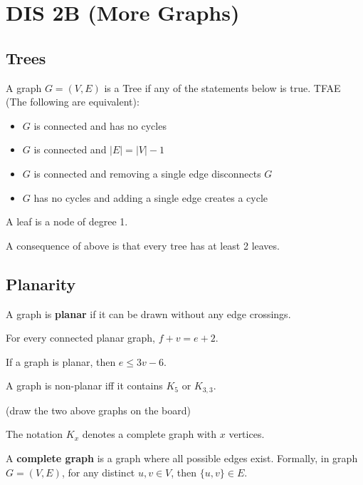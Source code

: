 \section{DIS 2B (More Graphs)}

\subsection{Trees}
A graph $G = (V,E)$ is a Tree if any of the statements below is true. TFAE (The following are equivalent):

\begin{itemize}
    \item $G$ is connected and has no cycles
    \item $G$ is connected and $|E| = |V| - 1$
    \item $G$ is connected and removing a single edge disconnects $G$
    \item $G$ has no cycles and adding a single edge creates a cycle
\end{itemize}

\begin{definition}
    A leaf is a node of degree 1. 
\end{definition}
A consequence of above is that every tree has at least 2 leaves. 

\subsection{Planarity}
\begin{definition}[planar]
    A graph is \textbf{planar} if it can be drawn without any edge crossings. 
\end{definition}


\begin{theorem}[Euler]
    For every connected planar graph, $f + v = e + 2$.
\end{theorem}

\begin{corollary}
    If a graph is planar, then $e \le 3v - 6$. 
\end{corollary}

\begin{theorem}[Kuratowski]
    A graph is non-planar iff it contains $K_5$ or $K_{3,3}$. 
\end{theorem}
(draw the two above graphs on the board)

The notation $K_x$ denotes a complete graph with $x$ vertices. 

\begin{definition}
    A \textbf{complete graph} is a graph where all possible edges exist. Formally, in graph $G = (V,E)$, for any distinct $u,v \in V$, then $\{u,v\} \in E$. 
\end{definition}

